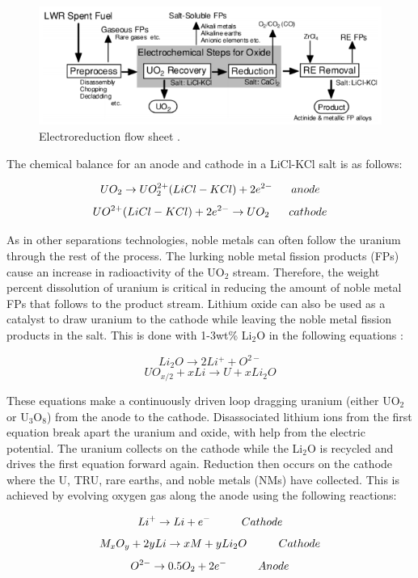\begin{figure}[h]
	\centering
	\includegraphics[width=\linewidth]{images/reduction_flow}
	\caption{Electroreduction flow sheet \cite{ohta}.}
\end{figure}

The chemical balance for an anode and cathode in a LiCl-KCl salt is as follows:

\[ UO_2 \rightarrow UO_2^{2+}(LiCl-KCl) + 2e^{2-} \hspace{6mm} anode \]
\[ UO^{2+}(LiCl-KCl) + 2e^{2-} \rightarrow UO_2 \hspace{6mm} cathode \]

As in other separations technologies, noble metals can often follow the uranium through the rest of the process.
The lurking noble metal fission products (FPs) cause an increase in radioactivity of the UO$_2$ stream. 
Therefore, the weight percent dissolution of uranium is critical in reducing the amount of noble metal FPs that follows to the product stream.
Lithium oxide can also be used as a catalyst to draw uranium to the cathode while leaving the noble metal fission products in the salt.
This is done with 1-3wt\% Li$_2$O in the following equations \cite{hur_electrochemical_nodate}:

\[ Li_2O \rightarrow 2Li^+ + O^{2-} \]
\[ UO_{x/2} + xLi \rightarrow U + xLi_2O \]

These equations make a continuously driven loop dragging uranium (either UO$_2$ or U$_3$O$_8$) from the anode to the cathode. 
Disassociated lithium ions from the first equation break apart the uranium and oxide, with help from the electric potential.
The uranium collects on the cathode while the Li$_2$O is recycled and drives the first equation forward again. 
Reduction then occurs on the cathode where the U, TRU, rare earths, and noble metals (NMs) have collected.
This is achieved by evolving oxygen gas along the anode using the following reactions\cite{hur_electrochemical_nodate,organisation}:

\[ Li^+ \rightarrow Li + e^- \hspace{10mm} Cathode \]
\[ M_xO_y + 2yLi \rightarrow xM + yLi_2O \hspace{10mm} Cathode \]
\[ O^{2-} \rightarrow 0.5O_2 + 2e^- \hspace{10mm} Anode \]

